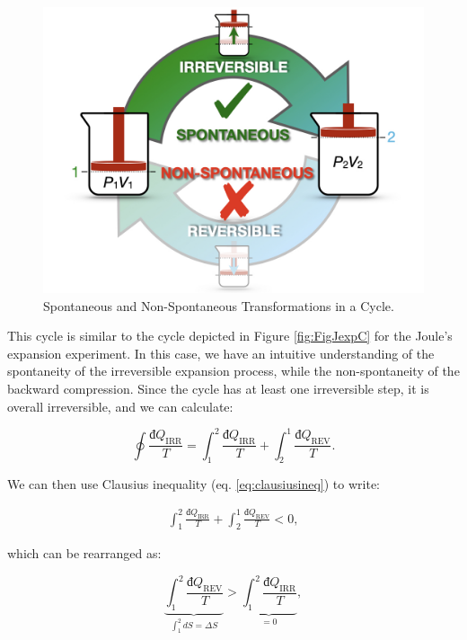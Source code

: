 \documentclass[
  9pt,
]{extbook}
\theoremstyle{definition}
\theoremstyle{definition}
\theoremstyle{definition}
\theoremstyle{remark}
\begin{document}
\begin{figure}

{\centering \includegraphics[width=0.8\linewidth]{./img/OEP_Figures.011} 

}

\caption{Spontaneous and Non-Spontaneous Transformations in a Cycle.}\label{fig:FigJexpC2}
\end{figure}

This cycle is similar to the cycle depicted in Figure \ref{fig:FigJexpC} for the Joule's expansion experiment. In this case, we have an intuitive understanding of the spontaneity of the irreversible expansion process, while the non-spontaneity of the backward compression. Since the cycle has at least one irreversible step, it is overall irreversible, and we can calculate:

\begin{equation}
\oint \frac{đQ_{\mathrm{IRR}}}{T} = \int_1^2 \frac{đQ_{\mathrm{IRR}}}{T} + \int_2^1 \frac{đQ_{\mathrm{REV}}}{T}.
\label{eq:qirrcycle}
\end{equation}

We can then use Clausius inequality (eq. \eqref{eq:clausiusineq}) to write:

\begin{equation}
\begin{aligned}
\int_1^2 \frac{đQ_{\mathrm{IRR}}}{T} + \int_2^1 \frac{đQ_{\mathrm{REV}}}{T} < 0,
\end{aligned}
\label{eq:qirrcycle1}
\end{equation}

which can be rearranged as:

\begin{equation}
\underbrace{\int_1^2 \frac{đQ_{\mathrm{REV}}}{T}}_{\int_1^2 dS = \Delta S} > \underbrace{\int_1^2 \frac{đQ_{\mathrm{IRR}}}{T}}_{=0},
\label{eq:qirrcycle2}
\end{equation}
\end{document}
